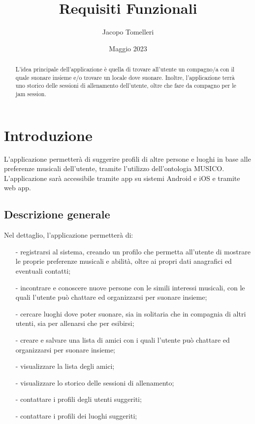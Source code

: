\documentclass[12pt, a4paper]{article}
\title{Requisiti Funzionali}
\author{Jacopo Tomelleri}
\date{Maggio 2023}
\begin{document}
\maketitle
\newpage
\tableofcontents
\newpage

\begin{abstract}
    L'idea principale dell'applicazione è quella di trovare all'utente un compagno/a con il quale suonare insieme e/o trovare un locale dove suonare.
    Inoltre, l'applicazione terrà uno storico delle sessioni di allenamento dell'utente, oltre che fare da compagno per le jam session.
\end{abstract}

\section{Introduzione}
L'applicazione permetterà di suggerire profili di altre persone e luoghi in base alle preferenze musicali dell'utente, tramite l'utilizzo dell'ontologia MUSICO.
L'applicazione sarà accessibile tramite app su sistemi Android e iOS e tramite web app.

\subsection{Descrizione generale}

Nel dettaglio, l'applicazione permetterà di:
\begin{itemize}
    \item[-] registrarsi al sistema, creando un profilo che permetta all'utente di mostrare le proprie preferenze musicali e abilità, oltre ai propri dati anagrafici ed eventuali contatti;
    \item[-] incontrare e conoscere nuove persone con le simili interessi musicali, con le quali l'utente può chattare ed organizzarsi per suonare insieme;
    \item[-] cercare luoghi dove poter suonare, sia in solitaria che in compagnia di altri utenti, sia per allenarsi che per esibirsi;
    \item[-] creare e salvare una lista di amici con i quali l'utente può chattare ed organizzarsi per suonare insieme;
    \item[-] visualizzare la lista degli amici;
    \item[-] visualizzare lo storico delle sessioni di allenamento;
    \item[-] contattare i profili degli utenti suggeriti;
    \item[-] contattare i profili dei luoghi suggeriti;
\end{itemize}
\end{document}
